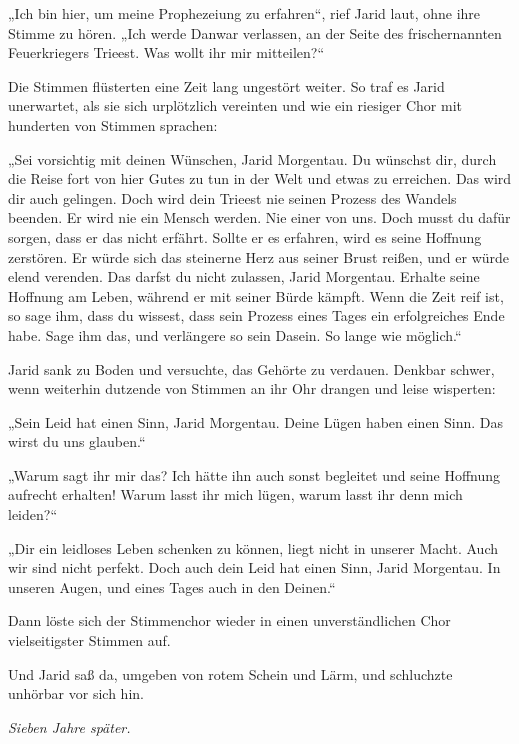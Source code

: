 „Ich bin hier, um meine Prophezeiung zu erfahren“, rief Jarid laut, ohne ihre Stimme zu hören. „Ich werde Danwar verlassen, an der Seite des frischernannten Feuerkriegers Trieest. Was wollt ihr mir mitteilen?“

Die Stimmen flüsterten eine Zeit lang ungestört weiter. So traf es Jarid unerwartet, als sie sich urplötzlich vereinten und wie ein riesiger Chor mit hunderten von Stimmen sprachen:

„Sei vorsichtig mit deinen Wünschen, Jarid Morgentau. Du wünschst dir, durch die Reise fort von hier Gutes zu tun in der Welt und etwas zu erreichen. Das wird dir auch gelingen. Doch wird dein Trieest nie seinen Prozess des Wandels beenden. Er wird nie ein Mensch werden. Nie einer von uns. Doch musst du dafür sorgen, dass er das nicht erfährt. Sollte er es erfahren, wird es seine Hoffnung zerstören. Er würde sich das steinerne Herz aus seiner Brust reißen, und er würde elend verenden. Das darfst du nicht zulassen, Jarid Morgentau. Erhalte seine Hoffnung am Leben, während er mit seiner Bürde kämpft. Wenn die Zeit reif ist, so sage ihm, dass du wissest, dass sein Prozess eines Tages ein erfolgreiches Ende habe. Sage ihm das, und verlängere so sein Dasein. So lange wie möglich.“

Jarid sank zu Boden und versuchte, das Gehörte zu verdauen. Denkbar schwer, wenn weiterhin dutzende von Stimmen an ihr Ohr drangen und leise wisperten:

„Sein Leid hat einen Sinn, Jarid Morgentau. Deine Lügen haben einen Sinn. Das wirst du uns glauben.“

„Warum sagt ihr mir das? Ich hätte ihn auch sonst begleitet und seine Hoffnung aufrecht erhalten! Warum lasst ihr mich lügen, warum lasst ihr denn mich leiden?“

„Dir ein leidloses Leben schenken zu können, liegt nicht in unserer Macht. Auch wir sind nicht perfekt. Doch auch dein Leid hat einen Sinn, Jarid Morgentau. In unseren Augen, und eines Tages auch in den Deinen.“

Dann löste sich der Stimmenchor wieder in einen unverständlichen Chor vielseitigster Stimmen auf.

Und Jarid saß da, umgeben von rotem Schein und Lärm, und schluchzte unhörbar vor sich hin.








\textit{Sieben Jahre später.}\bigskip




